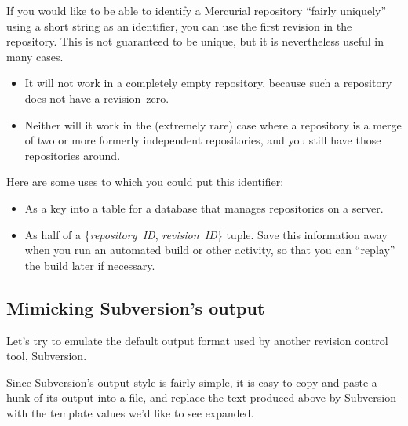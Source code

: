 {{If you would like to be able to identify a Mercurial repository
``fairly uniquely'' using a short string as an identifier, you can
use the first revision in the repository.
This is not guaranteed to be unique, but it is nevertheless useful in
many cases.
\begin{itemize}
\item It will not work in a completely empty repository, because such
  a repository does not have a revision~zero.
\item Neither will it work in the (extremely rare) case where a
  repository is a merge of two or more formerly independent
  repositories, and you still have those repositories around.
\end{itemize}
Here are some uses to which you could put this identifier:
\begin{itemize}
\item As a key into a table for a database that manages repositories
  on a server.
\item As half of a \{\emph{repository~ID}, \emph{revision~ID}\} tuple.
  Save this information away when you run an automated build or other
  activity, so that you can ``replay'' the build later if necessary.
\end{itemize}

\subsection{Mimicking Subversion's output}

Let's try to emulate the default output format used by another
revision control tool, Subversion.

Since Subversion's output style is fairly simple, it is easy to
copy-and-paste a hunk of its output into a file, and replace the text
produced above by Subversion with the template values we'd like to see
expanded.

}}
